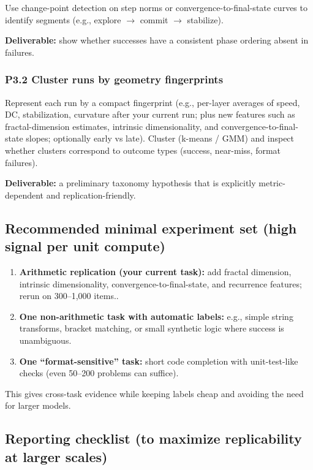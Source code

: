 Use change-point detection on step norms or convergence-to-final-state curves to identify segments (e.g., explore $\rightarrow$ commit $\rightarrow$ stabilize).

\textbf{Deliverable:} show whether successes have a consistent phase ordering absent in failures.

\subsubsection{P3.2 Cluster runs by geometry fingerprints}

Represent each run by a compact fingerprint (e.g., per-layer averages of speed, DC, stabilization, curvature
after your current run; plus new features such as fractal-dimension estimates, intrinsic dimensionality, and convergence-to-final-state slopes; optionally early vs late). Cluster (k-means / GMM) and inspect whether clusters correspond to outcome types (success, near-miss, format failures).

\textbf{Deliverable:} a preliminary taxonomy hypothesis that is explicitly metric-dependent and replication-friendly.

\subsection{Recommended minimal experiment set (high signal per unit compute)}

\begin{enumerate}[leftmargin=*]\item \textbf{Arithmetic replication (your current task):} add fractal dimension, intrinsic dimensionality, convergence-to-final-state, and recurrence features; rerun on 300--1{,}000 items..
\item \textbf{One non-arithmetic task with automatic labels:} e.g., simple string transforms, bracket matching, or small synthetic logic where success is unambiguous.
\item \textbf{One ``format-sensitive'' task:} short code completion with unit-test-like checks (even 50--200 problems can suffice).
\end{enumerate}

This gives cross-task evidence while keeping labels cheap and avoiding the need for larger models.

\subsection{Reporting checklist (to maximize replicability at larger scales)}

